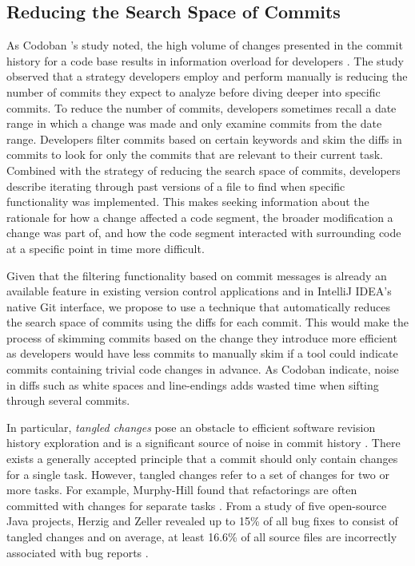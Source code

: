 \subsection{Reducing the Search Space of Commits}
\label{subsec:Reducing-Commit-Search-Space}

As Codoban \etal's study noted, the high volume of changes presented in the commit history for a code base results in information overload for developers \cite{codoban_software_2015}.
The study observed that a strategy developers employ and perform manually is reducing the number of commits they expect to analyze before diving deeper into specific commits.
To reduce the number of commits, developers sometimes recall a date range in which a change was made and only examine commits from the date range.
Developers filter commits based on certain keywords and skim the diffs in commits to look for only the commits that are relevant to their current task.
Combined with the strategy of reducing the search space of commits, developers describe iterating through past versions of a file to find when specific functionality was implemented.
This makes seeking information about the rationale for how a change affected a code segment, the broader modification a change was part of, and how the code segment interacted with surrounding code at a specific point in time more difficult.

Given that the filtering functionality based on commit messages is already an available feature in existing version control  applications and in IntelliJ IDEA's native Git interface, we propose to use a technique that automatically reduces the search space of commits using the diffs for each commit.
This would make the process of skimming commits based on the change they introduce more efficient as developers would have less commits to manually skim if a tool could indicate commits containing trivial code changes in advance.
As Codoban \etal indicate, noise in diffs such as white spaces and line-endings adds wasted time when sifting through several commits.

In particular, \emph{tangled changes} pose an obstacle to efficient software revision history exploration and is a significant source of noise in commit history \cite{herzig_tangled_2013}.
There exists a generally accepted principle that a commit should only contain changes for a single task.
However, tangled changes refer to a set of changes for two or more tasks. 
For example, Murphy-Hill \etal found that refactorings are often committed with changes for separate tasks \cite{murphy-hill_refactor_2012}. 
From a study of five open-source Java projects, Herzig and Zeller revealed up to 15\% of all bug fixes to consist of tangled changes and on average, at least 16.6\% of all source files are incorrectly associated with bug reports \cite{herzig_tangled_2013}.

